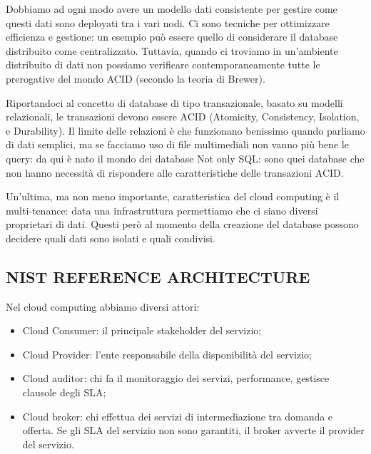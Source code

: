 Dobbiamo ad ogni modo avere un modello dati consistente per gestire come questi dati sono deployati tra i vari nodi. Ci sono tecniche per ottimizzare efficienza e gestione: un esempio può essere quello di considerare il database distribuito come centralizzato. Tuttavia, quando ci troviamo in un’ambiente distribuito di dati non possiamo verificare contemporaneamente tutte  le prerogative del mondo ACID (secondo la teoria di Brewer). 

Riportandoci al concetto di database di tipo transazionale, basato su modelli relazionali,  le transazioni devono essere ACID (Atomicity, Consistency, Isolation, e Durability). Il limite  delle relazioni è che funzionano benissimo quando parliamo di dati semplici, ma se facciamo uso  di file multimediali non vanno più bene le query: da qui è nato il mondo dei database Not only SQL: sono quei database che non hanno necessità di rispondere alle caratteristiche  delle transazioni ACID. 

Un’ultima, ma non meno importante, caratteristica del cloud computing è il multi-tenance:  data una infrastruttura permettiamo che ci siano diversi proprietari di dati. Questi però al momento della creazione del database possono decidere quali dati sono isolati e quali condivisi.


\subsection{NIST REFERENCE ARCHITECTURE}

Nel cloud computing abbiamo diversi attori: 

\begin{itemize}

\item{Cloud Consumer}: il principale stakeholder del servizio;
\item{Cloud Provider}: l’ente responsabile della disponibilità del servizio;
\item{Cloud auditor}: chi fa il monitoraggio dei servizi, performance, gestisce clausole degli SLA;
\item{Cloud broker}: chi effettua dei servizi di intermediazione tra domanda e offerta. 
Se gli SLA del servizio non sono garantiti, il broker avverte il provider del servizio.

\end{itemize}

